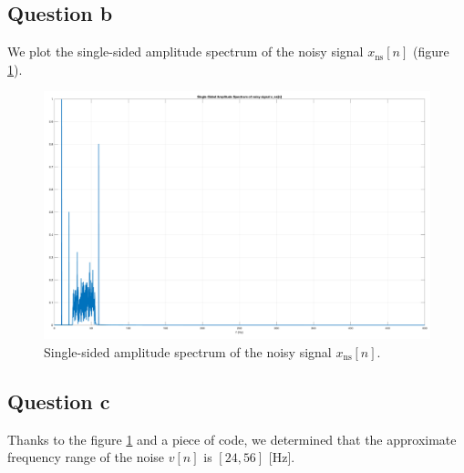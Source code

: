 \documentclass[a4paper, 12pt]{article}
\begin{document}
	\subsection*{Question b}
	We plot the single-sided amplitude spectrum of the noisy signal $x_{\text{ns}}[n]$ (figure \ref{fig:question_b}).
	\begin{figure}[H]
	    \centering
	    \includegraphics[width=\textwidth]{resources/pdf/question_b.pdf}
	    \caption{Single-sided amplitude spectrum of the noisy signal $x_{\text{ns}}[n]$.}
	    \label{fig:question_b}
	\end{figure}
	\subsection*{Question c}
	Thanks to the figure \ref{fig:question_b} and a piece of code, we determined that the approximate frequency range of the noise $v[n]$ is $[24, 56]$ [Hz].
\end{document}
